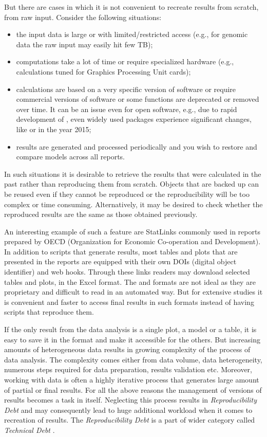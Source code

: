 \documentclass[nojss]{jss}\usepackage[]{graphicx}\usepackage[]{color}
\begin{document}
But there are cases in which it is not convenient to recreate results from scratch, from raw input. Consider the following situations: 
\begin{itemize}
\item the input data is large or with limited/restricted access (e.g., for genomic data the raw input may easily hit few TB); 
\item computations take a lot of time or require specialized hardware (e.g., calculations tuned for Graphics Processing Unit cards); 
\item calculations are based on a very specific version of software or require commercial versions of software or some functions are  deprecated or removed over time. It can be an issue even for open software, e.g., due to rapid development of , even widely used packages experience significant changes, like  or  in the year 2015;
\item results are generated and processed periodically and you wish to restore and compare models across all reports. 
\end{itemize}

In such situations it is desirable to retrieve the results that were calculated in the past rather than reproducing them from scratch. Objects that are backed up can be reused even if they cannot be reproduced or the reproducibility will be too complex or time consuming. Alternatively, it may be desired to check whether the reproduced results are the same as those obtained previously.

An interesting example of such a feature are StatLinks \citep[see][]{statlink} commonly used in reports prepared by OECD (Organization for Economic Co-operation and Development). In addition to scripts that generate results, most tables and plots that are presented in the reports are equipped with their own DOIs (digital object identifier) and web hooks. Through these links readers may download selected tables and plots, in the Excel format. 
The  and  formats are not ideal as they are proprietary and difficult to read in an automated way. But for extensive studies it is convenient and faster to access final results in such formats instead of having scripts that reproduce them.

If the only result from the data analysis is a single plot, a model or a table, it is easy to save it in the  format and make it accessible for the others. But increasing amounts of heterogeneous data results in growing complexity of the process of data analysis. The complexity comes either from data volume, data heterogeneity, numerous steps required for data preparation, results validation etc. Moreover, working with data is often a highly iterative process that generates large amount of partial or final results. For all the above reasons the management of versions of results becomes a task in itself. Neglecting this process results in \textit{Reproducibility Debt} and may consequently lead to huge additional workload when it comes to recreation of results. The \textit{Reproducibility Debt} is a part of wider category called \textit{Technical Debt} \citep[see][]{TechnicalDebt}.
\end{document}
